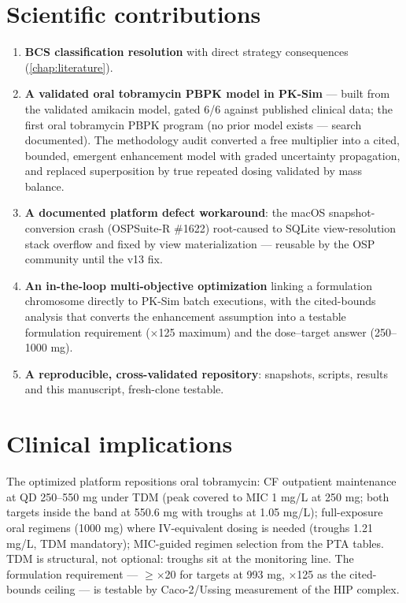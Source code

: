 \section{Scientific contributions}
\begin{enumerate}
\item \textbf{BCS classification resolution} with direct strategy consequences (\cref{chap:literature}).
\item \textbf{A validated oral tobramycin PBPK model in PK-Sim} --- built from the validated amikacin model, gated 6/6 against published clinical data; the first oral tobramycin PBPK program (no prior model exists --- search documented). The methodology audit converted a free multiplier into a cited, bounded, emergent enhancement model with graded uncertainty propagation, and replaced superposition by true repeated dosing validated by mass balance.
\item \textbf{A documented platform defect workaround}: the macOS snapshot-conversion crash (OSPSuite-R \#1622) root-caused to SQLite view-resolution stack overflow and fixed by view materialization --- reusable by the OSP community until the v13 fix.
\item \textbf{An in-the-loop multi-objective optimization} linking a formulation chromosome directly to PK-Sim batch executions, with the cited-bounds analysis that converts the enhancement assumption into a testable formulation requirement ($\times$125 maximum) and the dose--target answer (250--1000 mg).
\item \textbf{A reproducible, cross-validated repository}: snapshots, scripts, results and this manuscript, fresh-clone testable.
\end{enumerate}

\section{Clinical implications}
The optimized platform repositions oral tobramycin: CF outpatient maintenance at QD 250--550 mg under TDM (peak covered to MIC 1 mg/L at 250 mg; both targets inside the band at 550.6 mg with troughs at 1.05 mg/L); full-exposure oral regimens (1000 mg) where IV-equivalent dosing is needed (troughs 1.21 mg/L, TDM mandatory); MIC-guided regimen selection from the PTA tables. TDM is structural, not optional: troughs sit at the monitoring line. The formulation requirement --- $\geq\times$20 for targets at 993 mg, $\times$125 as the cited-bounds ceiling --- is testable by Caco-2/Ussing measurement of the HIP complex.


